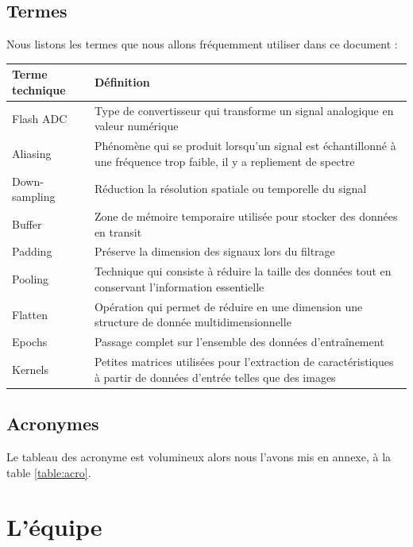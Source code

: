 \documentclass[a4paper,11pt]{article}
\begin{document}
\subsection{Termes}
Nous listons les termes que nous allons fréquemment utiliser dans ce document : 
\begin{table}[H]
\centering
\begin{tabular}{|l|p{10cm}|}
\hline
\textbf{Terme technique} & \textbf{Définition} \\
\hline
Flash ADC & Type de convertisseur qui transforme un signal analogique en valeur numérique \\ 
\hline
Aliasing & Phénomène qui se produit lorsqu’un signal est échantillonné à une fréquence trop faible, il y a repliement de spectre\\
\hline
Down-sampling & Réduction la résolution spatiale ou temporelle du signal \\
\hline
Buffer & Zone de mémoire temporaire utilisée pour stocker des données en transit\\
\hline
Padding & Préserve la dimension des signaux lors du filtrage \\
\hline
Pooling & Technique qui consiste à réduire la taille des données tout en conservant l’information essentielle \\
\hline
Flatten & Opération qui permet de réduire en une dimension une structure de donnée multidimensionnelle \\
\hline
Epochs & Passage complet sur l’ensemble des données d'entraînement\\
\hline
Kernels & Petites matrices utilisées pour l'extraction de caractéristiques à partir de données d'entrée telles que des images \\
\hline
\end{tabular}
\end{table}
			
\subsection{Acronymes} \label{acro}
Le tableau des acronyme est volumineux alors nous l'avons mis en annexe, à la table \ref{table:acro}.
			
\section{L'équipe}
\end{document}
